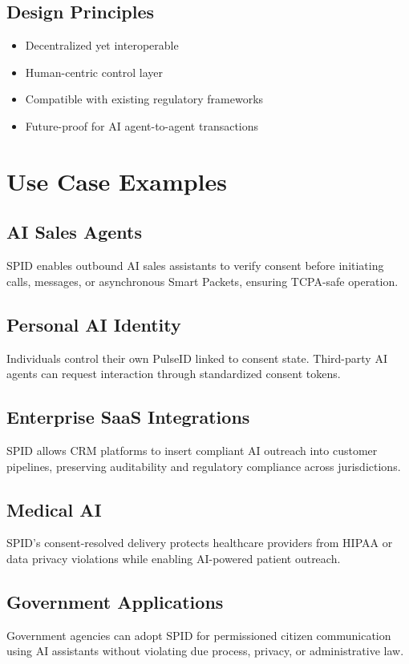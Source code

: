 \documentclass[conference]{IEEEtran}
\begin{document}
\subsection{Design Principles}
\begin{itemize}
    \item Decentralized yet interoperable
    \item Human-centric control layer
    \item Compatible with existing regulatory frameworks
    \item Future-proof for AI agent-to-agent transactions
\end{itemize}

\section{Use Case Examples}

\subsection{AI Sales Agents}
SPID enables outbound AI sales assistants to verify consent before initiating calls, messages, or asynchronous Smart Packets, ensuring TCPA-safe operation.

\subsection{Personal AI Identity}
Individuals control their own PulseID linked to consent state. Third-party AI agents can request interaction through standardized consent tokens.

\subsection{Enterprise SaaS Integrations}
SPID allows CRM platforms to insert compliant AI outreach into customer pipelines, preserving auditability and regulatory compliance across jurisdictions.

\subsection{Medical AI}
SPID's consent-resolved delivery protects healthcare providers from HIPAA or data privacy violations while enabling AI-powered patient outreach.

\subsection{Government Applications}
Government agencies can adopt SPID for permissioned citizen communication using AI assistants without violating due process, privacy, or administrative law.
\end{document}
